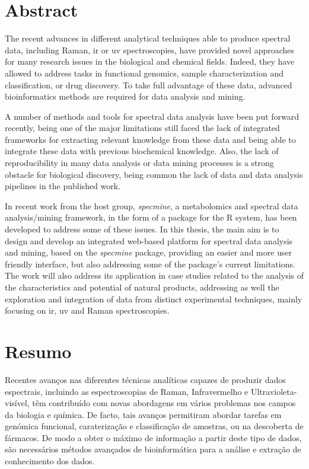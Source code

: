 
\chapter*{Abstract}

The recent advances in different analytical techniques able to produce spectral data, including Raman, \gls{ir} or \gls{uv} spectroscopies, have provided novel approaches for many research issues in the biological and chemical fields. Indeed, they have allowed to address tasks in functional genomics, sample characterization and classification, or drug discovery. To take full advantage of these data, advanced bioinformatics methods are required for data analysis and mining. 

A number of methods and tools for spectral data analysis have been put forward recently, being one of the major limitations still faced the lack of integrated frameworks for extracting relevant knowledge from these data and being able to integrate these data with previous biochemical knowledge. Also, the lack of reproducibility in many data analysis or data mining processes is a strong obstacle for biological discovery, being common the lack of data and data analysis pipelines in the published work.

In recent work from the host group, \textit{specmine}, a metabolomics and spectral data analysis/mining framework, in the form of a package for the R system, has been developed to address some of these issues. In this thesis, the main aim is to design and develop an integrated web-based platform for spectral data analysis and mining, based on the \textit{specmine} package, providing an easier and more user friendly interface, but also addressing some of the package's current limitations. The work will also address its application in case studies related to the analysis of the characteristics and potential of natural products, addressing as well the exploration and integration of data from distinct experimental techniques, mainly focusing on \gls{ir}, \gls{uv} and Raman spectroscopies.


\cleardoublepage

\chapter*{Resumo}

Recentes avanços nas diferentes técnicas analíticas capazes de produzir dados espectrais, incluindo as espectroscopias de Raman, Infravermelho e Ultravioleta-visível, têm contribuído com novas abordagens em vários problemas nos campos da biologia e química. De facto, tais avanços permitiram abordar tarefas em genómica funcional, caraterização e classificação de amostras, ou na descoberta de fármacos. De modo a obter o máximo de informação a partir deste tipo de dados, são necessários métodos avançados de bioinformática para a análise e extração de conhecimento dos dados.

